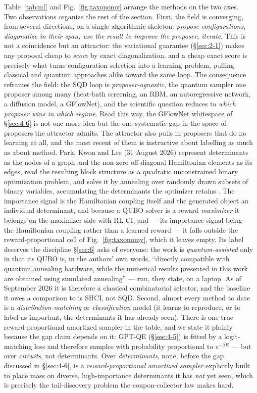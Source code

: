 \documentclass[onecolumn,a4paper]{quantumarticle}
\begin{document}
Table~\ref{tab:ml} and Fig.~\ref{fig:taxonomy} arrange the methods on the two axes. Two observations organize the rest of the section. First, the field is converging, from several directions, on a single algorithmic skeleton: \emph{propose configurations, diagonalize in their span, use the result to improve the proposer, iterate}. This is not a coincidence but an attractor: the variational guarantee (\S\ref{sec:2-1}) makes any proposal cheap to \emph{score} by exact diagonalization, and a cheap exact score is precisely what turns configuration selection into a learning problem, pulling classical and quantum approaches alike toward the same loop. The consequence reframes the field: the SQD loop is \emph{proposer-agnostic}, the quantum sampler one proposer among many (heat-bath screening, an RBM, an autoregressive network, a diffusion model, a GFlowNet), and the scientific question reduces to \emph{which proposer wins in which regime}. Read this way, the GFlowNet whitespace of \S\ref{sec:4-6} is not one more idea but the one systematic gap in the space of proposers the attractor admits. The attractor also pulls in proposers that do no learning at all, and the most recent of them is instructive about labelling as much as about method. Park, Kwon and Lee (31 August 2026) represent determinants as the nodes of a graph and the non-zero off-diagonal Hamiltonian elements as its edges, read the resulting block structure as a quadratic unconstrained binary optimization problem, and solve it by annealing over randomly drawn subsets of binary variables, accumulating the determinants the optimizer retains \cite{park2026fa}. The importance signal is the Hamiltonian coupling itself and the generated object an individual determinant, and because a QUBO solver is a reward \emph{maximizer} it belongs on the maximizer side with RL-CI, and --- its importance signal being the Hamiltonian coupling rather than a learned reward --- it falls outside the reward-proportional cell of Fig.~\ref{fig:taxonomy}, which it leaves empty. Its label deserves the discipline \S\ref{sec:6} asks of everyone: the work is \emph{quantum-assisted} only in that its QUBO is, in the authors' own words, ``directly compatible with quantum annealing hardware, while the numerical results presented in this work are obtained using simulated annealing'' --- run, they state, on a laptop. As of September 2026 it is therefore a classical combinatorial selector, and the baseline it owes a comparison to is SHCI, not SQD. Second, almost every method to date is a \emph{distribution-matching} or \emph{classification} model (it learns to reproduce, or to label as important, the determinants it has already seen). There is one true reward-proportional amortized sampler in the table, and we state it plainly because the gap claim depends on it: GPT-QE (\S\ref{sec:4-5}) is fitted by a logit-matching loss and therefore samples with probability proportional to $e^{-\beta E}$ --- but over \emph{circuits}, not determinants. Over \emph{determinants}, none, before the gap discussed in \S\ref{sec:4-6}, is a \emph{reward-proportional amortized sampler} explicitly built to place mass on diverse, high-importance determinants it has \emph{not} yet seen, which is precisely the tail-discovery problem the coupon-collector law makes hard.
\end{document}
